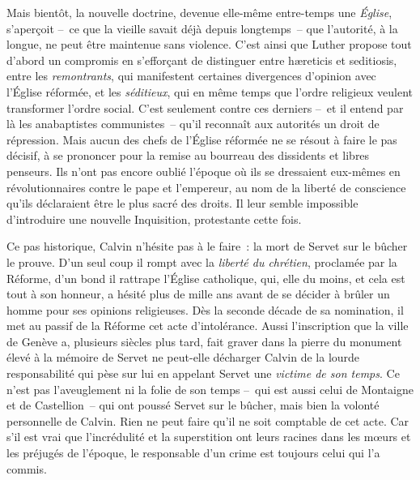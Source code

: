\documentclass[french,twoside]{book} %
\newcommand{\astermono}{\medskip\centerline{\color{rubric}\large\selectfont{\syms ✻}}\medskip\par}%
\begin{document}
\noindent Mais bientôt, la nouvelle doctrine, devenue elle-même entre-temps une \emph{Église}, s’aperçoit – ce que la vieille savait déjà depuis longtemps – que l’autorité, à la longue, ne peut être maintenue sans violence. C’est ainsi que Luther propose tout d’abord un compromis en s’efforçant de distinguer entre hæreticis et seditiosis, entre les \emph{remontrants}, qui manifestent certaines divergences d’opinion avec l’Église réformée, et les \emph{séditieux}, qui en même temps que l’ordre religieux veulent transformer l’ordre social. C’est seulement contre ces derniers – et il entend par là les anabaptistes communistes – qu’il reconnaît aux autorités un droit de répression. Mais aucun des chefs de l’Église réformée ne se résout à faire le pas décisif, à se prononcer pour la remise au bourreau des dissidents et libres penseurs. Ils n’ont pas encore oublié l’époque où ils se dressaient eux-mêmes en révolutionnaires contre le pape et l’empereur, au nom de la liberté de conscience qu’ils déclaraient être le plus sacré des droits. Il leur semble impossible d’introduire une nouvelle Inquisition, protestante cette fois.\par
Ce pas historique, Calvin n’hésite pas à le faire : la mort de Servet sur le bûcher le prouve. D’un seul coup il rompt avec la \emph{liberté du chrétien}, proclamée par la Réforme, d’un bond il rattrape l’Église catholique, qui, elle du moins, et cela est tout à son honneur, a hésité plus de mille ans avant de se décider à brûler un homme pour ses opinions religieuses. Dès la seconde décade de sa nomination, il met au passif de la Réforme cet acte d’intolérance. Aussi l’inscription que la ville de Genève a, plusieurs siècles plus tard, fait graver dans la pierre du monument élevé à la mémoire de Servet ne peut-elle décharger Calvin de la lourde responsabilité qui pèse sur lui en appelant Servet une \emph{victime de son temps}. Ce n’est pas l’aveuglement ni la folie de son temps – qui est aussi celui de Montaigne et de Castellion – qui ont poussé Servet sur le bûcher, mais bien la volonté personnelle de Calvin. Rien ne peut faire qu’il ne soit comptable de cet acte. Car s’il est vrai que l’incrédulité et la superstition ont leurs racines dans les mœurs et les préjugés de l’époque, le responsable d’un crime est toujours celui qui l’a commis.\par

\astermono
\end{document}
